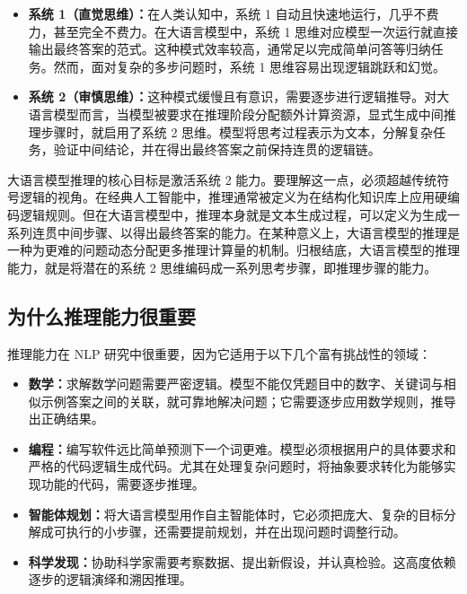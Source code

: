 \begin{itemize}
\item \vspace{0.5cm} \textbf{系统 1（直觉思维）：}在人类认知中，系统 1 自动且快速地运行，几乎不费力，甚至完全不费力。在大语言模型中，系统 1 思维对应模型一次运行就直接输出最终答案的范式。这种模式效率较高，通常足以完成简单问答等归纳任务。然而，面对复杂的多步问题时，系统 1 思维容易出现逻辑跳跃和幻觉。
\item \vspace{0.3cm} \textbf{系统 2（审慎思维）：}这种模式缓慢且有意识，需要逐步进行逻辑推导。对大语言模型而言，当模型被要求在推理阶段分配额外计算资源，显式生成中间推理步骤时，就启用了系统 2 思维。模型将思考过程表示为文本，分解复杂任务，验证中间结论，并在得出最终答案之前保持连贯的逻辑链。
\end{itemize}
\vspace{0.3cm}

大语言模型推理的核心目标是激活系统 2 能力。要理解这一点，必须超越传统符号逻辑的视角。在经典人工智能中，推理通常被定义为在结构化知识库上应用硬编码逻辑规则。但在大语言模型中，推理本身就是文本生成过程，可以定义为生成一系列连贯中间步骤、以得出最终答案的能力。在某种意义上，大语言模型的推理是一种为更难的问题动态分配更多推理计算量的机制。归根结底，大语言模型的推理能力，就是将潜在的系统 2 思维编码成一系列思考步骤，即推理步骤的能力。

\subsection{为什么推理能力很重要}

推理能力在 NLP 研究中很重要，因为它适用于以下几个富有挑战性的领域：

\begin{itemize}
\item \vspace{0.5cm} \textbf{数学：}求解数学问题需要严密逻辑。模型不能仅凭题目中的数字、关键词与相似示例答案之间的关联，就可靠地解决问题；它需要逐步应用数学规则，推导出正确结果。
\item \vspace{0.2cm} \textbf{编程：}编写软件远比简单预测下一个词更难。模型必须根据用户的具体要求和严格的代码逻辑生成代码。尤其在处理复杂问题时，将抽象要求转化为能够实现功能的代码，需要逐步推理。
\item \vspace{0.2cm} \textbf{智能体规划：}将大语言模型用作自主智能体时，它必须把庞大、复杂的目标分解成可执行的小步骤，还需要提前规划，并在出现问题时调整行动。
\item \vspace{0.2cm} \textbf{科学发现：}协助科学家需要考察数据、提出新假设，并认真检验。这高度依赖逐步的逻辑演绎和溯因推理。
\end{itemize}
\vspace{0.3cm}

